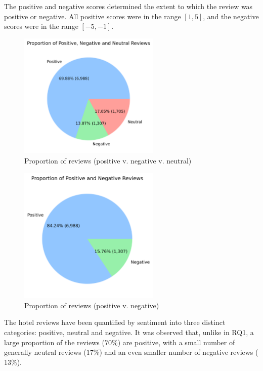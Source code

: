 \documentclass[12pt,bibliography=totocnumbered]{scrartcl}
\begin{document}
{The positive and negative scores determined the extent to which the review was positive
or negative. All positive scores were in the range $[1, 5]$, and the negative scores were
in the range $[-5, -1]$.

\begin{figure}[htpb]
	\begin{center}
		\includegraphics[width=0.6\textwidth]{../results/rq2/pie_chart_3part.png}
	\end{center}
	\caption{Proportion of reviews (positive v. negative v. neutral)}
	\label{fig:reviews-pie3}
\end{figure}

\begin{figure}[htpb]
	\begin{center}
		\includegraphics[width=0.6\textwidth]{../results/rq2/pie_chart_2part.png}
	\end{center}
	\caption{Proportion of reviews (positive v. negative)}
	\label{fig:reviews-pie4}
\end{figure}

The hotel reviews have been quantified by sentiment into three distinct categories:
positive, neutral and negative. It was observed that, unlike in RQ1, a large proportion
of the reviews ($70\%$) are positive, with a small number of generally neutral reviews ($17\%$)
and an even smaller number of negative reviews ($13\%$).

}
\end{document}
